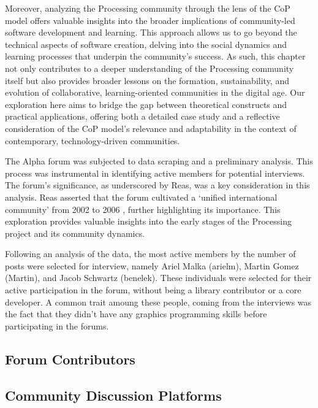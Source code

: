 Moreover, analyzing the Processing community through the lens of the CoP model offers valuable insights into the broader implications of community-led software development and learning. This approach allows us to go beyond the technical aspects of software creation, delving into the social dynamics and learning processes that underpin the community's success. As such, this chapter not only contributes to a deeper understanding of the Processing community itself but also provides broader lessons on the formation, sustainability, and evolution of collaborative, learning-oriented communities in the digital age. Our exploration here aims to bridge the gap between theoretical constructs and practical applications, offering both a detailed case study and a reflective consideration of the CoP model's relevance and adaptability in the context of contemporary, technology-driven communities.

The Alpha forum was subjected to data scraping and a preliminary analysis. This process was instrumental in identifying active members for potential interviews. The forum’s significance, as underscored by Reas, was a key consideration in this analysis. Reas asserted that the forum cultivated a ‘unified international community’ from 2002 to 2006 \parencite[331]{conradGraphicDesignPostdigital2021}, further highlighting its importance. This exploration provides valuable insights into the early stages of the Processing project and its community dynamics.

Following an analysis of the data, the most active members by the number of posts were selected for interview, namely Ariel Malka (arielm), Martin Gomez (Martin), and Jacob Schwartz (benelek). These individuals were selected for their active participation in the forum, without being a library contributor or a core developer. A common trait amoung these people, coming from the interviews was the fact that they didn't have any graphics programming skills before participating in the forums. 



\subsection{Forum Contributors}
\subsection{Community Discussion Platforms}


